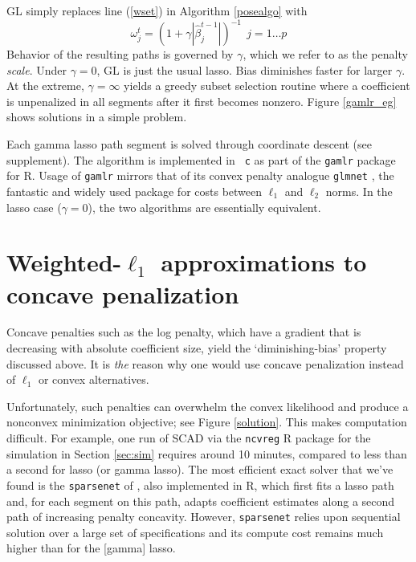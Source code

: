 \documentclass[12pt]{article}
\begin{document}
GL simply replaces line (\ref{wset}) in Algorithm \ref{posealgo}  with
\begin{equation}\label{gammalasso} \omega^{t}_j  = \left(1 + \gamma
|\hat\beta^{t-1}_j|\right)^{-1} ~~j=1\ldots p  \end{equation} Behavior of the
resulting paths  is governed by $\gamma$, which we refer to as the penalty
{\it scale}.  Under $\gamma=0$, GL is just the usual lasso.  Bias diminishes
faster for larger $\gamma$.  At the  extreme, $\gamma=\infty$ yields a greedy
subset selection routine where a coefficient is unpenalized in all segments
after it first becomes nonzero.   Figure \ref{gamlr_eg} shows solutions in a
simple problem.

Each  gamma lasso path segment is solved through coordinate descent (see supplement).  The algorithm is implemented in {\tt
c} as part of the {\tt gamlr} package for {\sf R}. 
Usage of {\tt gamlr} mirrors that of its
convex penalty analogue {\tt glmnet} \citep{friedman_regularization_2010}, the
fantastic and widely used package for costs between $\ell_1$ and $\ell_2$ norms. In
the lasso case ($\gamma=0$), the two algorithms are essentially equivalent.


\section{Weighted-$\ell_1$ approximations to concave penalization}
\label{sec:weighted}


Concave penalties such as the log penalty, which have a gradient that is
decreasing with absolute coefficient size,  yield the `diminishing-bias'
property discussed above. It is {\it the} reason why one would
use concave penalization instead of $\ell_1$ or convex alternatives.

Unfortunately, such penalties can overwhelm the convex likelihood and produce a
nonconvex minimization objective; see Figure \ref{solution}.
This  makes computation difficult.  For example,  one run of SCAD via the
\texttt{ncvreg} R package \citep{breheny_coordinate_2011} for the simulation in
Section \ref{sec:sim} requires around 10 minutes, compared to less than a second for 
lasso (or gamma lasso).  The most efficient exact solver that we've found is the
\texttt{sparsenet} of \citet{mazumder_sparsenet_2011}, also implemented in R,
which first fits a lasso path and, for
each segment on this path, adapts coefficient estimates along a second path of
increasing penalty concavity. However, \texttt{sparsenet}  relies upon sequential solution
over a large set of specifications 
 and its compute cost remains much higher than for the [gamma] lasso.
\end{document}
